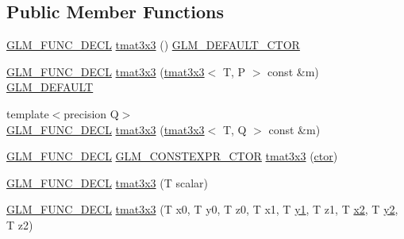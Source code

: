 \subsection*{Public Member Functions}
\begin{DoxyCompactItemize}
\item 
\mbox{\hyperlink{setup_8hpp_ab2d052de21a70539923e9bcbf6e83a51}{G\+L\+M\+\_\+\+F\+U\+N\+C\+\_\+\+D\+E\+CL}} \mbox{\hyperlink{structglm_1_1tmat3x3_ac20c2aecd1be84bcae07e30b0e1dc28d}{tmat3x3}} () \mbox{\hyperlink{setup_8hpp_afb97a4e995bc004c0cbbfa22125b80ba}{G\+L\+M\+\_\+\+D\+E\+F\+A\+U\+L\+T\+\_\+\+C\+T\+OR}}
\item 
\mbox{\hyperlink{setup_8hpp_ab2d052de21a70539923e9bcbf6e83a51}{G\+L\+M\+\_\+\+F\+U\+N\+C\+\_\+\+D\+E\+CL}} \mbox{\hyperlink{structglm_1_1tmat3x3_a0b809e3ca9e9a52ee512517df570a6d8}{tmat3x3}} (\mbox{\hyperlink{structglm_1_1tmat3x3}{tmat3x3}}$<$ T, P $>$ const \&m) \mbox{\hyperlink{setup_8hpp_aefce7051c376a64ba89fa93a9f63bc2c}{G\+L\+M\+\_\+\+D\+E\+F\+A\+U\+LT}}
\item 
{\footnotesize template$<$precision Q$>$ }\\\mbox{\hyperlink{setup_8hpp_ab2d052de21a70539923e9bcbf6e83a51}{G\+L\+M\+\_\+\+F\+U\+N\+C\+\_\+\+D\+E\+CL}} \mbox{\hyperlink{structglm_1_1tmat3x3_a8b70a7497b9dc3aba4c12a7fa847b265}{tmat3x3}} (\mbox{\hyperlink{structglm_1_1tmat3x3}{tmat3x3}}$<$ T, Q $>$ const \&m)
\item 
\mbox{\hyperlink{setup_8hpp_ab2d052de21a70539923e9bcbf6e83a51}{G\+L\+M\+\_\+\+F\+U\+N\+C\+\_\+\+D\+E\+CL}} \mbox{\hyperlink{setup_8hpp_ad34178a09666081abdb573c14d1f4a5a}{G\+L\+M\+\_\+\+C\+O\+N\+S\+T\+E\+X\+P\+R\+\_\+\+C\+T\+OR}} \mbox{\hyperlink{structglm_1_1tmat3x3_a6b5ffa0701600e08a8d73a2d9990b2d4}{tmat3x3}} (\mbox{\hyperlink{namespaceglm_a807df837905ec286f806a536af03b57f}{ctor}})
\item 
\mbox{\hyperlink{setup_8hpp_ab2d052de21a70539923e9bcbf6e83a51}{G\+L\+M\+\_\+\+F\+U\+N\+C\+\_\+\+D\+E\+CL}} \mbox{\hyperlink{structglm_1_1tmat3x3_a7d19c7dd303ec176f88c5745a51feb62}{tmat3x3}} (T scalar)
\item 
\mbox{\hyperlink{setup_8hpp_ab2d052de21a70539923e9bcbf6e83a51}{G\+L\+M\+\_\+\+F\+U\+N\+C\+\_\+\+D\+E\+CL}} \mbox{\hyperlink{structglm_1_1tmat3x3_abc56922cf0d112425311fbf6ea21928b}{tmat3x3}} (T x0, T y0, T z0, T x1, T \mbox{\hyperlink{glad_8h_a48340161068d267815ac3131e9d03def}{y1}}, T z1, T \mbox{\hyperlink{glad_8h_ad2cea6eadb01f017f0d57e7edf0ce988}{x2}}, T \mbox{\hyperlink{glad_8h_af7158b5d27f7a6aa4ab9973fcc3a5c20}{y2}}, T z2)
\item 

\end{DoxyCompactItemize}
